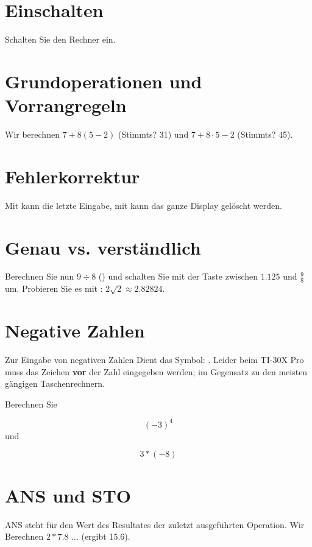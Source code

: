 

\renewcommand{\metaHeaderLine}{Arbeitsblatt}
\renewcommand{\arbeitsblattTitel}{Taschenrechner TI-30 Pro MathPrint
--- Einführung}

\arbeitsblattHeader{}

\section{Einschalten}
Schalten Sie den Rechner ein. 


\section{Grundoperationen und Vorrangregeln}
Wir berechnen $7 + 8(5-2)$  (Stimmts? 31) und $7 + 8\cdot 5 - 2$ (Stimmts? 45).

\section{Fehlerkorrektur}
Mit  kann die letzte Eingabe, mit 
kann das ganze Display gelöscht werden.

\section{Genau vs. verständlich}
Berechnen Sie nun $9 \div 8$ () und schalten Sie mit der
Taste  zwischen $1.125$ und $\frac{9}{8}$ um.
Probieren Sie es mit    :
$2\sqrt{2} \approx 2.82824$. 

\section{Negative Zahlen}
Zur Eingabe von negativen Zahlen Dient das
Symbol: . Leider beim TI-30X Pro muss das
Zeichen \textbf{vor} der Zahl eingegeben werden; im Gegensatz zu den
meisten gängigen Taschenrechnern.

Berechnen Sie

$$(-3)^4$$
und

$$3* (-8)$$
\newpage


\section{ANS und STO}
ANS steht für den Wert des
Resultates der zuletzt ausgeführten Operation. Wir Berechnen $2 * 7.8$ ... (ergibt 15.6).

